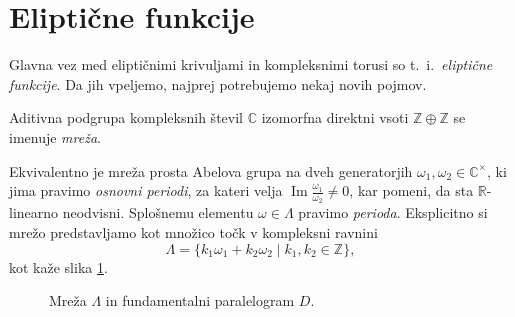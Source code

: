\documentclass[mat1]{fmfdelo}
\newcommand{\R}{\mathbb R}
\newcommand{\Z}{\mathbb Z}
\newcommand{\C}{\mathbb C}
\newcommand{\CM}{\mathbb C ^\times}
\renewcommand\Im{\operatorname{Im}}%
\theoremstyle{definition}
\begin{document}
\section{Eliptične funkcije} \label{elipticne funkcije}

Glavna vez med eliptičnimi krivuljami in kompleksnimi torusi so t.~i.\ \emph{eliptične funkcije}. Da jih vpeljemo, najprej potrebujemo nekaj novih pojmov.

\begin{definicija}
    Aditivna podgrupa kompleksnih števil $\C$ izomorfna direktni vsoti $\Z \oplus \Z$ se imenuje \emph{mreža}. 
\end{definicija}
    
Ekvivalentno je mreža prosta Abelova grupa na dveh generatorjih $\omega_1, \omega_2 \in \CM$, ki jima pravimo \emph{osnovni periodi}, za kateri velja $\Im \frac{\omega_1}{\omega_2} \neq 0$, kar pomeni, da sta $\R$-linearno neodvisni. Splošnemu elementu $\omega \in \Lambda$ pravimo \emph{perioda}. Eksplicitno si mrežo predstavljamo kot množico točk v kompleksni ravnini
\[
    \Lambda = \{k_1 \omega_1 + k_2 \omega_2 \mid k_1, k_2 \in \Z\},  
\]
kot kaže slika \ref{mreza}.
\\

\begin{figure}[H]
    \centering

    \caption{Mreža $\Lambda$ in fundamentalni paralelogram $D$.}
    \label{mreza}
\end{figure}
\end{document}
